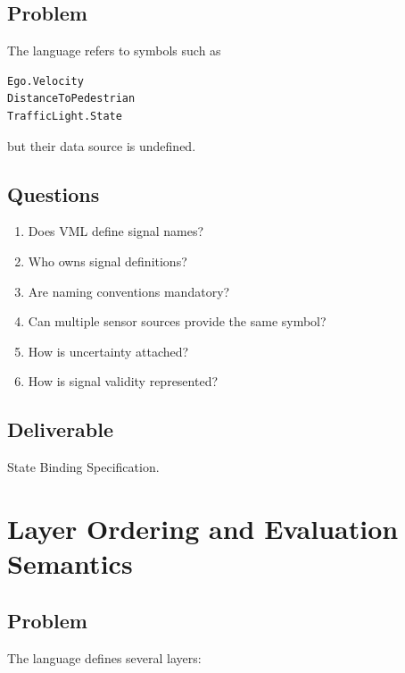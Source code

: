 \documentclass[a4paper,11pt]{article}
\begin{document}
\subsection{Problem}

The language refers to symbols such as

\begin{verbatim}
Ego.Velocity
DistanceToPedestrian
TrafficLight.State
\end{verbatim}

but their data source is undefined.

\subsection{Questions}

\begin{enumerate}

\item Does VML define signal names?

\item Who owns signal definitions?

\item Are naming conventions mandatory?

\item Can multiple sensor sources provide the same symbol?

\item How is uncertainty attached?

\item How is signal validity represented?

\end{enumerate}

\subsection{Deliverable}

State Binding Specification.

\section{Layer Ordering and Evaluation Semantics}

\subsection{Problem}

The language defines several layers:
\end{document}
